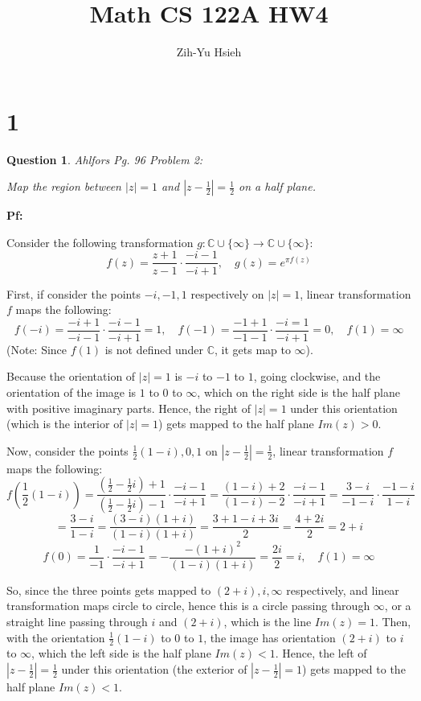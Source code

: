 \documentclass{article}
\title{Math CS 122A HW4}
\author{Zih-Yu Hsieh}
\newtheorem{question}{Question}
\begin{document}
\maketitle

\section*{1}
\begin{myBox}[]{}
    \begin{question}
        Ahlfors Pg. 96 Problem 2:

        Map the region between $|z|=1$ and $|z-\frac{1}{2}|=\frac{1}{2}$ on a half plane.
    \end{question}
\end{myBox}

\textbf{Pf:}

Consider the following transformation $g:\mathbb{C}\cup\{\infty\}\rightarrow\mathbb{C}\cup\{\infty\}$:
$$f(z)=\frac{z+1}{z-1}\cdot \frac{-i-1}{-i+1},\quad g(z)=e^{\pi f(z)}$$

First, if consider the points $-i,-1,1$ respectively on $|z|=1$, linear transformation $f$ maps the following:
$$f(-i)=\frac{-i+1}{-i-1}\cdot\frac{-i-1}{-i+1}=1,\quad f(-1)=\frac{-1+1}{-1-1}\cdot\frac{-i=1}{-i+1}=0,\quad f(1)=\infty$$
(Note: Since $f(1)$ is not defined under $\mathbb{C}$, it gets map to $\infty$).

Because the orientation of $|z|=1$ is $-i$ to $-1$ to $1$, going clockwise, and the orientation of the image is $1$ to $0$ to $\infty$, 
which on the right side is the half plane with positive imaginary parts. Hence, the right of $|z|=1$ under this orientation (which is the interior of $|z|=1$)
gets mapped to the half plane $Im(z)>0$.

\hfill

Now, consider the points $\frac{1}{2}(1-i), 0, 1$ on $|z-\frac{1}{2}|=\frac{1}{2}$, linear transformation $f$ maps the following:
$$f\left(\frac{1}{2}(1-i)\right)=\frac{(\frac{1}{2}-\frac{1}{2}i)+1}{(\frac{1}{2}-\frac{1}{2}i)-1}\cdot\frac{-i-1}{-i+1} = \frac{(1-i)+2}{(1-i)-2}\cdot\frac{-i-1}{-i+1}=\frac{3-i}{-1-i}\cdot\frac{-1-i}{1-i}$$
$$=\frac{3-i}{1-i}=\frac{(3-i)(1+i)}{(1-i)(1+i)}=\frac{3+1-i+3i}{2}=\frac{4+2i}{2}=2+i$$
$$f(0)=\frac{1}{-1}\cdot\frac{-i-1}{-i+1}=-\frac{-(1+i)^2}{(1-i)(1+i)}=\frac{2i}{2}=i,\quad f(1)=\infty$$

So, since the three points gets mapped to $(2+i), i, \infty$ respectively, and linear transformation maps circle to circle,
hence this is a circle passing through $\infty$, or a straight line passing through $i$ and $(2+i)$, which is the line $Im(z)=1$.
Then, with the orientation $\frac{1}{2}(1-i)$ to $0$ to $1$, the image has orientation $(2+i)$ to $i$ to $\infty$, which the left side is the half plane $Im(z)<1$.
Hence, the left of $|z-\frac{1}{2}|=\frac{1}{2}$ under this orientation (the exterior of $|z-\frac{1}{2}|=1$) gets mapped to the half plane $Im(z)<1$.
\end{document}
